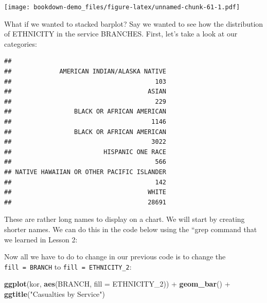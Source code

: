 \documentclass[]{book}
\newenvironment{Shaded}{\begin{snugshade}}{\end{snugshade}}
\newcommand{\KeywordTok}[1]{\textcolor[rgb]{0.13,0.29,0.53}{\textbf{{#1}}}}
\newcommand{\DataTypeTok}[1]{\textcolor[rgb]{0.13,0.29,0.53}{{#1}}}
\newcommand{\StringTok}[1]{\textcolor[rgb]{0.31,0.60,0.02}{{#1}}}
\newcommand{\NormalTok}[1]{{#1}}
\begin{document}
\texttt{[image: bookdown-demo\_files/figure-latex/unnamed-chunk-61-1.pdf]}

What if we wanted to stacked barplot? Say we wanted to see how the
distribution of ETHNICITY in the service BRANCHES. First, let's take a
look at our categories:

\begin{Shaded}
\end{Shaded}

\begin{verbatim}
## 
##             AMERICAN INDIAN/ALASKA NATIVE 
##                                       103 
##                                     ASIAN 
##                                       229 
##                 BLACK OR AFRICAN AMERICAN 
##                                      1146 
##                 BLACK OR AFRICAN AMERICAN 
##                                      3022 
##                         HISPANIC ONE RACE 
##                                       566 
## NATIVE HAWAIIAN OR OTHER PACIFIC ISLANDER 
##                                       142 
##                                     WHITE 
##                                     28691
\end{verbatim}

These are rather long names to display on a chart. We will start by
creating shorter names. We can do this in the code below using the
``grep command that we learned in Lesson 2:

\begin{Shaded}
\end{Shaded}

Now all we have to do to change in our previous code is to change the
\texttt{fill\ =\ BRANCH} to \texttt{fill\ =\ ETHNICITY\_2}:

\begin{Shaded}
\begin{Highlighting}[]
\KeywordTok{ggplot}\NormalTok{(kor, }\KeywordTok{aes}\NormalTok{(BRANCH, }\DataTypeTok{fill =} \NormalTok{ETHNICITY_2)) +}\StringTok{ }\KeywordTok{geom_bar}\NormalTok{() +}\StringTok{ }
\StringTok{  }\KeywordTok{ggtitle}\NormalTok{(}\StringTok{"Casualties by Service"}\NormalTok{)}
\end{Highlighting}
\end{Shaded}
\end{document}
